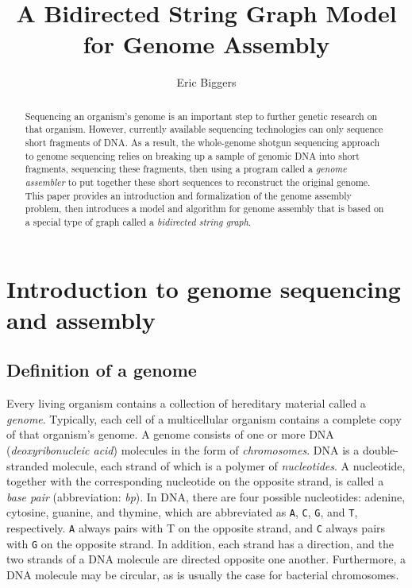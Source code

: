 \documentclass[12pt]{article}
\title{A Bidirected String Graph Model for Genome Assembly}
\author{Eric Biggers}
\newcommand\Base[1]{{\tt #1}}
\newcommand{\KeyTerm}[1]{{\it #1}}
\begin{document}
\maketitle

\begin{abstract}

Sequencing an organism's genome is an important step to further genetic research
on that organism.  However, currently available sequencing technologies can only
sequence short fragments of DNA.  As a result, the whole-genome shotgun
sequencing approach to genome sequencing relies on breaking up a sample of
genomic DNA into short fragments, sequencing these fragments, then using a
program called a {\em genome assembler} to put together these short sequences to
reconstruct the original genome.  This paper provides an introduction and
formalization of the genome assembly problem, then introduces a model and
algorithm for genome assembly that is based on a special type of graph called a
\KeyTerm{bidirected string graph}.  \end{abstract}

\tableofcontents

\section{Introduction to genome sequencing and assembly}

\subsection{Definition of a genome}

\label{sec:genome}

Every living organism contains a collection of hereditary material called a
\KeyTerm{genome}.  Typically, each cell of a multicellular organism contains a
complete copy of that organism's genome.  A genome consists of one or more DNA
(\KeyTerm{deoxyribonucleic acid}) molecules in the form of
\KeyTerm{chromosomes}.  DNA is a double-stranded molecule, each strand of which
is a polymer of \KeyTerm{nucleotides}.  A nucleotide, together with the
corresponding nucleotide on the opposite strand, is called a \KeyTerm{base pair}
(abbreviation: \KeyTerm{bp}).  In DNA, there are four possible nucleotides:
adenine, cytosine, guanine, and thymine, which are abbreviated as \Base{A},
\Base{C}, \Base{G}, and \Base{T}, respectively.  \Base{A} always pairs with T on
the opposite strand, and \Base{C} always pairs with \Base{G} on the opposite strand.
In addition, each strand has a direction, and the two strands of a DNA molecule
are directed opposite one another.  Furthermore, a DNA molecule may be circular,
as is usually the case for bacterial chromosomes.
\end{document}
